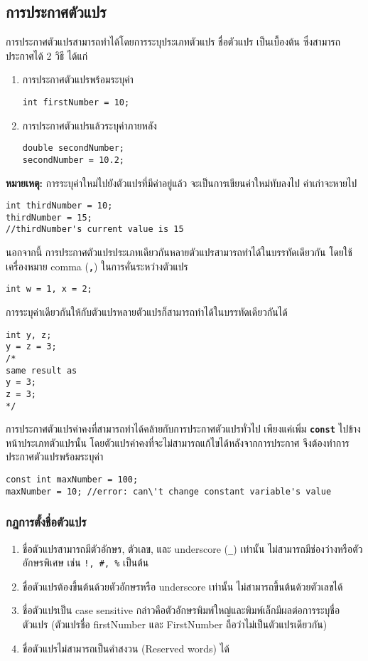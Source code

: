 \subsection{การประกาศตัวแปร}
การประกาศตัวแปรสามารถทำได้โดยการระบุประเภทตัวแปร ชื่อตัวแปร เป็นเบื้องต้น ซึ่งสามารถประกาศได้ 2 วิธี ได้แก่
\begin{enumerate}
\item การประกาศตัวแปรพร้อมระบุค่า
\begin{lstlisting}
int firstNumber = 10;
\end{lstlisting}
\item การประกาศตัวแปรแล้วระบุค่าภายหลัง
\begin{lstlisting}
double secondNumber;
secondNumber = 10.2;
\end{lstlisting}
\end{enumerate}
\textbf{หมายเหตุ:} การระบุค่าใหม่ไปยังตัวแปรที่มีค่าอยู่แล้ว จะเป็นการเขียนค่าใหม่ทับลงไป ค่าเก่าจะหายไป
\begin{lstlisting}
int thirdNumber = 10;
thirdNumber = 15;
//thirdNumber's current value is 15
\end{lstlisting}

นอกจากนี้ การประกาศตัวแปรประเภทเดียวกันหลายตัวแปรสามารถทำได้ในบรรทัดเดียวกัน โดยใช้เครื่องหมาย comma (\textbf{\texttt{,}}) ในการคั่นระหว่างตัวแปร
\begin{lstlisting}
int w = 1, x = 2;
\end{lstlisting}

การระบุค่าเดียวกันให้กับตัวแปรหลายตัวแปรก็สามารถทำได้ในบรรทัดเดียวกันได้
\begin{lstlisting}
int y, z;
y = z = 3;
/*
same result as
y = 3;
z = 3;
*/
\end{lstlisting}

การประกาศตัวแปรค่าคงที่สามารถทำได้คล้ายกับการประกาศตัวแปรทั่วไป เพียงแค่เพิ่ม \textbf{\texttt{const}} ไปข้างหน้าประเภทตัวแปรนั้น โดยตัวแปรค่าคงที่จะไม่สามารถแก้ไขได้หลังจากการประกาศ จึงต้องทำการประกาศตัวแปรพร้อมระบุค่า
\begin{lstlisting}
const int maxNumber = 100;
maxNumber = 10;	//error: can\'t change constant variable's value
\end{lstlisting}

\newpage
\subsubsection{กฎการตั้งชื่อตัวแปร}
\begin{enumerate}
\item ชื่อตัวแปรสามารถมีตัวอักษร, ตัวเลข, และ underscore (\texttt{\_}) เท่านั้น ไม่สามารถมีช่องว่างหรือตัวอักษรพิเศษ เช่น \texttt{!, \#, \%} เป็นต้น
\item ชื่อตัวแปรต้องขึ้นต้นด้วยตัวอักษรหรือ underscore เท่านั้น ไม่สามารถขึ้นต้นด้วยตัวเลขได้
\item ชื่อตัวแปรเป็น case sensitive กล่าวคือตัวอักษรพิมพ์ใหญ่และพิมพ์เล็กมีผลต่อการระบุชื่อตัวแปร (ตัวแปรชื่อ firstNumber และ FirstNumber ถือว่าไม่เป็นตัวแปรเดียวกัน)
\item ชื่อตัวแปรไม่สามารถเป็นคำสงวน (Reserved words) ได้
\end{enumerate}
